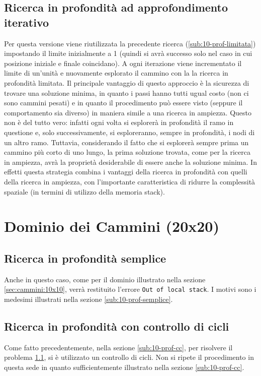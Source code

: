 \subsection{Ricerca in profondità ad approfondimento iterativo} \label{sub:10-prof-it}
Per questa versione viene riutilizzata la precedente ricerca (\ref{sub:10-prof-limitata}) impostando il limite inizialmente a 1 (quindi si avrà successo solo nel caso in cui posizione iniziale e finale coincidano). A ogni iterazione viene incrementato il limite di un'unità e nuovamente esplorato il cammino con la la ricerca in profondità limitata. Il principale vantaggio di questo approccio è la sicurezza di trovare una soluzione minima, in quanto i passi hanno tutti ugual costo (non ci sono cammini pesati) e in quanto il procedimento può essere visto (seppure il comportamento sia diverso) in maniera simile a una ricerca in ampiezza. Questo non è del tutto vero: infatti ogni volta si esplorerà in profondità il ramo in questione e, solo successivamente, si esploreranno, sempre in profondità, i nodi di un altro ramo. Tuttavia, considerando il fatto che si esplorerà sempre prima un cammino più corto di uno lungo, la prima soluzione trovata, come per la ricerca in ampiezza, avrà la proprietà desiderabile di essere anche la soluzione minima. In effetti questa strategia combina i vantaggi della ricerca in profondità con quelli della ricerca in ampiezza, con l'importante caratteristica di ridurre la complessità spaziale (in termini di utilizzo della memoria stack).

\section{Dominio dei Cammini (20x20)} \label{sec:20-prof}

\subsection{Ricerca in profondità semplice} \label{sub:20-prof-semplice}
Anche in questo caso, come per il dominio illustrato nella sezione \ref{sec:cammini:10x10}, verrà restituito l'errore \texttt{Out of local stack}. I motivi sono i medesimi illustrati nella sezione \ref{sub:10-prof-semplice}.

\subsection{Ricerca in profondità con controllo di cicli} \label{sub:20-prof-cc}
Come fatto precedentemente, nella sezione \ref{sub:10-prof-cc}, per risolvere il problema \ref{sub:20-prof-semplice}, si è utilizzato un controllo di cicli. Non si ripete il procedimento in questa sede in quanto sufficientemente illustrato nella sezione \ref{sub:10-prof-cc}.

